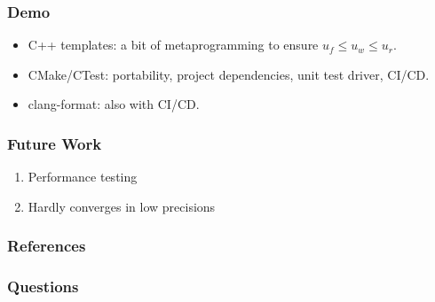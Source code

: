 \documentclass[t,12pt,numbers,fleqn]{beamer}
\begin{document}

\begin{frame}
\frametitle{Demo}

\begin{itemize}
\item C++ templates: a bit of metaprogramming to ensure \(u_f \leq u_w \leq u_r\).
\item CMake/CTest: portability, project dependencies, unit test driver, CI/CD.
\item clang-format: also with CI/CD.
\end{itemize}

\end{frame}


\begin{frame}
\frametitle{Future Work}

\begin{enumerate}
\item Performance testing
\item Hardly converges in low precisions
\end{enumerate}

\end{frame}


\begin{frame}
\frametitle{References}

\printbibliography[heading=none]{}

\end{frame}


\begin{frame}
\frametitle{Questions}

\end{frame}

\end{document}
